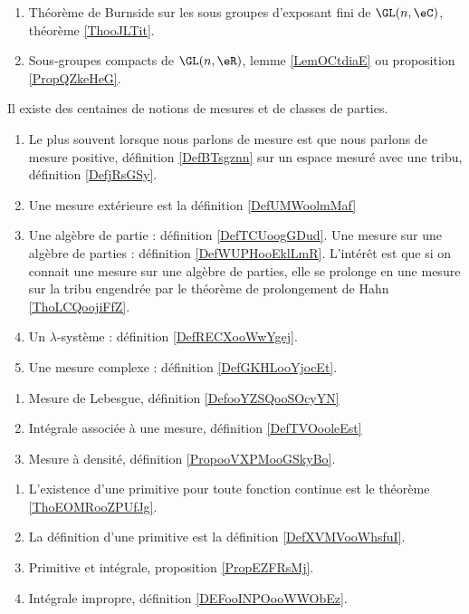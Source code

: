\begin{enumerate}
    \item 
        Théorème de Burnside sur les sous groupes d'exposant fini de \( \GL(n,\eC)\), théorème \ref{ThooJLTit}.
    \item 
        Sous-groupes compacts de \( \GL(n,\eR)\), lemme \ref{LemOCtdiaE} ou proposition \ref{PropQZkeHeG}.
\end{enumerate}

  \label{INTooVDSCooHXLLKp}
    Il existe des centaines de notions de mesures et de classes de parties.
    \begin{enumerate}
        \item
            Le plus souvent lorsque nous parlons de mesure est que nous parlons de mesure positive, définition \ref{DefBTsgznn} sur un espace mesuré avec une tribu, définition \ref{DefjRsGSy}.
        \item
            Une mesure extérieure est la définition \ref{DefUMWoolmMaf}
        \item 
            Une algèbre de partie : définition \ref{DefTCUoogGDud}. Une mesure sur une algèbre de parties : définition \ref{DefWUPHooEklLmR}. L'intérêt est que si on connait une mesure sur une algèbre de parties, elle se prolonge en une mesure sur la tribu engendrée par le théorème de prolongement de Hahn \ref{ThoLCQoojiFfZ}.
        \item
            Un \( \lambda\)-système : définition \ref{DefRECXooWwYgej}.
        \item
            Une mesure complexe : définition \ref{DefGKHLooYjocEt}.
    \end{enumerate}


\begin{enumerate}
        \item
            Mesure de Lebesgue, définition \ref{DefooYZSQooSOcyYN}
        \item
            Intégrale associée à une mesure, définition \ref{DefTVOooleEst}
        \item
            Mesure à densité, définition \ref{PropooVXPMooGSkyBo}.
\end{enumerate}

\begin{enumerate}
    \item
        L'existence d'une primitive pour toute fonction continue est le théorème \ref{ThoEOMRooZPUfJg}.
    \item
        La définition d'une primitive est la définition \ref{DefXVMVooWhsfuI}.
    \item
        Primitive et intégrale, proposition \ref{PropEZFRsMj}.
    \item
        Intégrale impropre, définition \ref{DEFooINPOooWWObEz}.
\end{enumerate}

